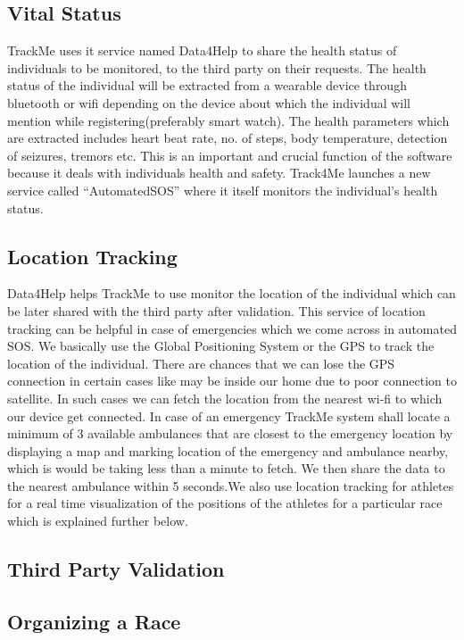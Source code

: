\subsection{Vital Status}
\qquad TrackMe uses it service named Data4Help to share the health status of individuals to be monitored, to the third party on their requests. The health status of the individual will be extracted from a wearable device  through bluetooth or wifi depending on the device about which the individual will mention while registering(preferably smart watch). The health parameters which are extracted includes heart beat rate, no. of steps, body temperature, detection of seizures, tremors etc. This is an important and crucial function of the software because it deals with individuals health and safety. Track4Me launches a new service called “AutomatedSOS” where it itself monitors the individual's health status.

\subsection{Location Tracking}
\qquad Data4Help helps TrackMe to use monitor the location of the individual which can be later shared with the third party after validation. This service of location tracking can be helpful in case of emergencies which we come across in automated SOS. We basically use the Global Positioning System or the GPS to track the location of the individual. There are chances that we can lose the GPS connection in certain cases like may be inside our home due to poor connection to satellite. In such cases we can fetch the location from the nearest wi-fi to which our device get connected. In case of an emergency TrackMe system shall locate a minimum of 3 available ambulances that are closest to the emergency location by displaying a map and marking location of the emergency and ambulance nearby, which is would be taking less than a minute to fetch. We then share the data to the nearest ambulance within 5 seconds.We also use location tracking for athletes for a real time visualization of the positions of the athletes for a particular race which is explained further below.


\subsection{Third Party Validation}

\subsection{Organizing a Race}

